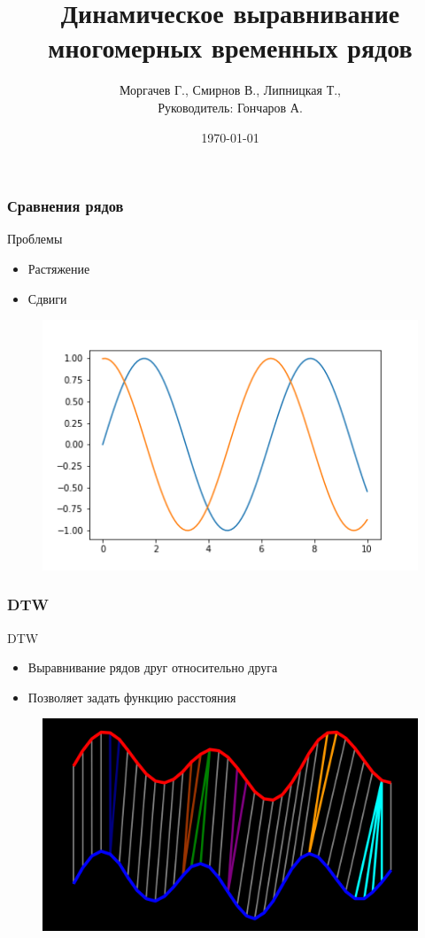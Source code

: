 \documentclass{beamer}
\title[DTW]{Динамическое выравнивание многомерных временных рядов}
\author{Моргачев Г., Смирнов В., Липницкая Т., \\ Руководитель: Гончаров А.}
\date{\today}
\begin{document}

\begin{frame}
\titlepage 
\end{frame}


\begin{frame}
\frametitle{Сравнения рядов}
	\begin{block}{Проблемы}
        \begin{itemize}
            \item Растяжение
            \item Сдвиги
        \end{itemize}
    \end{block}
    \begin{figure}
        \includegraphics[width=0.6\linewidth]{2}
    \end{figure}
\end{frame}


\begin{frame}
\frametitle{DTW}
    \begin{block}{DTW}
        \begin{itemize}
            \item Выравнивание рядов друг относительно друга
            \item Позволяет задать функцию расстояния
        \end{itemize} 
    \end{block}
    \begin{figure}
        \includegraphics[width=0.6\linewidth]{1}
    \end{figure}
\end{frame}
    
\end{document}
